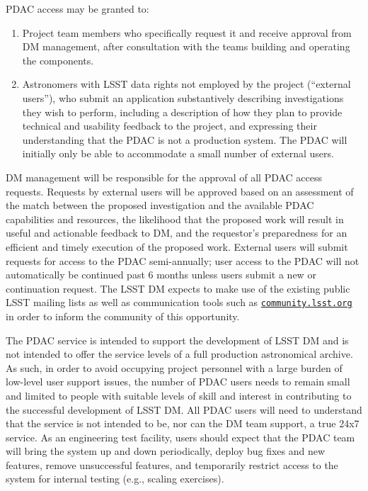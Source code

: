 \documentclass[DM,lsstdraft,toc]{lsstdoc}
\begin{document}
PDAC access may be granted to:
\begin{enumerate}
\item Project team members who specifically request it and receive approval from DM management, after consultation with the teams building and operating the components.

\item Astronomers with LSST data rights not employed by the project (``external users''), who submit an application substantively describing investigations they wish to perform, including a description of how they plan to provide technical and usability feedback to the project, and expressing their understanding that the PDAC is not a production system. The PDAC will initially only be able to accommodate a small number of external users.
\end{enumerate}
DM management will be responsible for the approval of all PDAC access requests. Requests by external users will be approved based on an assessment of the match between the proposed investigation and the available PDAC capabilities and resources, the likelihood that the proposed work will result in useful and actionable feedback to DM, and the requestor's preparedness for an efficient and timely execution of the proposed work. External users will submit requests for access to the PDAC semi-annually; user access to the PDAC will not automatically be continued past 6 months unless users submit a new or continuation request. The LSST DM expects to make use of the existing public LSST mailing lists as well as communication tools such as \href{https://community.lsst.org}{\texttt{community.lsst.org}} in order to inform the community of this opportunity.

The PDAC service is intended to support the development of LSST DM and is not intended to offer the service levels of a full production astronomical archive. As such, in order to avoid occupying project personnel with a large burden of low-level user support issues, the number of PDAC users needs to remain small and limited to people with suitable levels of skill and interest in contributing to the successful development of LSST DM. All PDAC users will need to understand that the service is not intended to be, nor can the DM team support, a true 24x7 service. As an engineering test facility, users should expect that the PDAC team will bring the system up and down periodically, deploy bug fixes and new features, remove unsuccessful features, and temporarily restrict access to the system for internal testing (e.g., scaling exercises).
\end{document}
